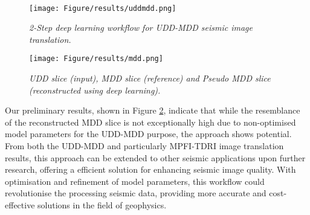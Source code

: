 \\
\begin{figure}[ht]
	\centering
	\texttt{[image: Figure/results/uddmdd.png]} %
	\caption{\textit{2-Step deep learning workflow for UDD-MDD seismic image translation.}}
	\label{fig:uddmdd}
\end{figure}
\begin{figure}[ht]
	\centering
	\texttt{[image: Figure/results/mdd.png]} %
	\caption{\textit{UDD slice (input), MDD slice (reference) and Pseudo MDD slice (reconstructed using deep learning).}}
	\label{fig:mdd}
\end{figure}

\noindent Our preliminary results, shown in Figure \ref{fig:mdd}, indicate that while the resemblance of the reconstructed MDD slice is not exceptionally high due to non-optimised model parameters for the UDD-MDD purpose, the approach shows potential.\\

\noindent From both the UDD-MDD and particularly MPFI-TDRI image translation results, this approach can be extended to other seismic applications upon further research, offering a efficient solution for enhancing seismic image quality. With optimisation and refinement of model parameters, this workflow could revolutionise the processing seismic data, providing more accurate and cost-effective solutions in the field of geophysics.


